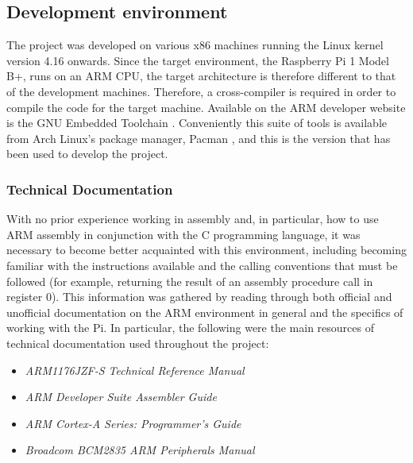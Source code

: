 \subsection{Development environment}
    The project was developed on various x86 machines running the Linux kernel
    version 4.16 onwards. Since the target environment, the Raspberry Pi 1 Model
    B+, runs on an ARM CPU, the target architecture is therefore different to
    that of the development machines. Therefore, a cross-compiler is required in
    order to compile the code for the target machine. Available on the ARM
    developer website is the GNU Embedded Toolchain \cite{GNUToolchain}.
    Conveniently this suite of tools is available from Arch Linux's package
    manager, Pacman \cite{PacmanEABI}, and this is the version that has been
    used to develop the project.

    \subsubsection{Technical Documentation}
        With no prior experience working in assembly and, in particular, how to
        use ARM assembly in conjunction with the C programming language, it was
        necessary to become better acquainted with this environment, including
        becoming familiar with the instructions available and the calling
        conventions that must be followed (for example, returning the result of
        an assembly procedure call in register 0). This information was gathered
        by reading through both official and unofficial documentation on the ARM
        environment in general and the specifics of working with the Pi. In
        particular, the following were the main resources of technical
        documentation used throughout the project:
        \begin{itemize}
            \itemsep0em 
            \item \textit{ARM1176JZF-S Technical Reference Manual} \cite{TRM}
            \item \textit{ARM Developer Suite Assembler Guide}
                \cite{OnlineARMGuide}
            \item \textit{ARM Cortex-A Series: Programmer's Guide}
                \cite{ProgrammersGuide}
            \item \textit{Broadcom BCM2835 ARM Peripherals Manual} \cite{BCM2835}
        \end{itemize}

